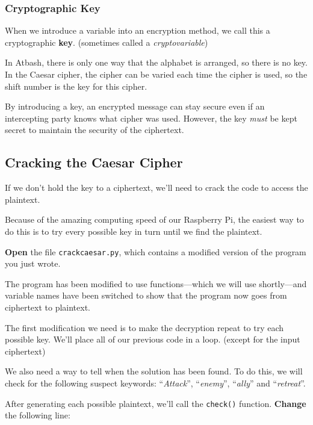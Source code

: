 	\subsubsection*{Cryptographic Key}
	
		When we introduce a variable into an encryption method, we call this a cryptographic \textbf{key}. (sometimes called a \textit{cryptovariable})
		
		In Atbash, there is only one way that the alphabet is arranged, so there is no key. In the Caesar cipher, the cipher can be varied each time the cipher is used, so the shift number is the key for this cipher.
		
		\ifprint\else By introducing a key, an encrypted message can stay secure even if an intercepting party knows what cipher was used. However, the key \textit{must} be kept secret to maintain the security of the ciphertext. \fi

\subsection{Cracking the Caesar Cipher}

		If we don't hold the key to a ciphertext, we'll need to crack the code to access the plaintext.
		
		Because of the amazing computing speed of our Raspberry Pi, the easiest way to do this is to try every possible key in turn until we find the plaintext.
		
		\textbf{Open} the file \texttt{crackcaesar.py}, which contains a modified version of the program you just wrote.
		
		The program has been modified to use functions---which we will use shortly---and variable names have been switched to show that the program now goes from ciphertext to plaintext.
		
		The first modification we need is to make the decryption repeat to try each possible key. We'll place all of our previous code in a loop. (except for the input ciphertext)
		
		
		
		We also need a way to tell when the solution has been found. To do this, we will check for the following suspect keywords: ``\textit{Attack}'', ``\textit{enemy}'', ``\textit{ally}'' and ``\textit{retreat}''.
		
		After generating each possible plaintext, we'll call the \texttt{check()} function. \textbf{Change} the following line:
	
